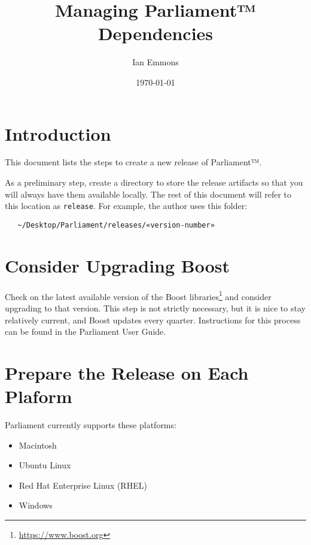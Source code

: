 \documentclass[12pt,letterpaper,draft]{article}
\title{Managing Parliament™ Dependencies}
\author{Ian Emmons}
\date{\today}
\newcommand{\urlcite}[1]{\footnote{\url{#1}}}
\begin{document}
\maketitle



\section{Introduction}

This document lists the steps to create a new release of Parliament™.

As a preliminary step, create a directory to store the release artifacts so that you will always have them available locally.  The rest of this document will refer to this location as \texttt{release}.  For example, the author uses this folder:

\begin{verbatim}
   ~/Desktop/Parliament/releases/«version-number»
\end{verbatim}



\section{Consider Upgrading Boost}

Check on the latest available version of the Boost libraries\urlcite{https://www.boost.org} and consider upgrading to that version.  This step is not strictly necessary, but it is nice to stay relatively current, and Boost updates every quarter.  Instructions for this process can be found in the Parliament User Guide.



\section{Prepare the Release on Each Plaform}

Parliament currently supports these platforms:
\begin{itemize}[noitemsep]
	\item Macintosh
	\item Ubuntu Linux
	\item Red Hat Enterprise Linux (RHEL)
	\item Windows
\end{itemize}
\end{document}
